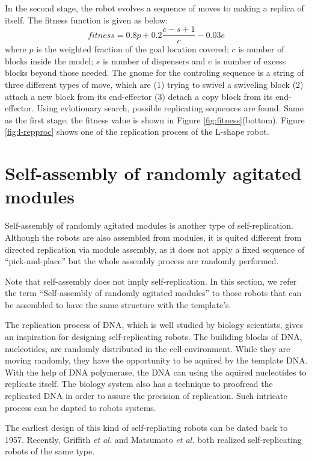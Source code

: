 \documentclass[12pt,twoside]{article}
\theoremstyle{plain}
\theoremstyle{definition}
\theoremstyle{remark}
\newcommand{\etal}{\textit{et al.}}
\begin{document}
In the second stage, the robot evolves a sequence of moves to making a replica of itself. The fitness function is given as below: 
\[ fitness = 0.8p + 0.2 \frac{c - s + 1}{c} - 0.03 e \] 
where $p$ is the weighted fraction of the goal location covered; $c$ is number of blocks inside the model; $s$ is number of dispensers and $e$ is number of excess blocks beyond those needed. The gnome for the controling sequence is a string of three different types of move, which are (1) trying to swivel a swiveling block (2) attach a new block from its end-effector (3) detach a copy block from its end-effector. Using evlotionary search, possible replicating sequences are found. Same as the first stage, the fitness value is shown in  Figure \ref{fig:fitness}(bottom). Figure \ref{fig:l-repproc} shows one of the replication process of the L-shape robot.

\section{Self-assembly of randomly agitated modules}
\label{sec:random}

Self-assembly of randomly agitated modules is another type of self-replication. Although the robots are also assembled from modules, it is quited different from directed replication via module assembly, as it does not apply a fixed sequence of ``pick-and-place'' but the whole assembly process are randomly performed. 

Note that self-assembly does not imply self-replication. In this section, we refer the term ``Self-assembly of randomly agitated modules'' to those robots that can be assembled to have the same structure with the template's. 

The replication process of DNA, which is well studied by biology scientists, gives an inspiration for designing self-replicating robots. The builiding blocks of DNA, nucleotides, are randomly distributed in the cell environment. While they are moving randomly, they have the opportunity to be aquired by the template DNA. With the help of DNA polymerase, the DNA can using the aquired nucleotides to replicate itself. The biology system also has a technique to proofread the replicated DNA in order to assure the precision of replication\cite{alberts_molecular_2002}. Such intricate process can be dapted to robots systems.

The earliest design of this kind of self-repliating robots can be dated back to 1957\cite{penrose_self-reproducing_1957}. Recently, Griffith \etal \cite{griffith_self-replication_2005} and Matsumoto \etal \cite{matsumoto_passive_2009} both realized self-replicating robots of the same type.
\end{document}
